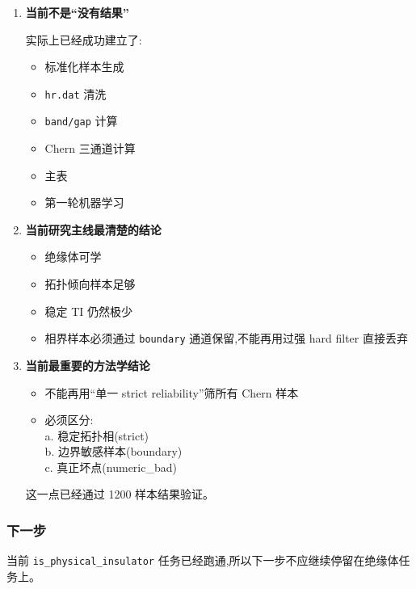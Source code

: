 \documentclass[lang=cn,scheme=chinese,color=blue,device=normal,toc=onecol,math=cm]{elegantbook}
\begin{document}
\begin{enumerate}
\item \textbf{当前不是“没有结果”}\par
 
实际上已经成功建立了:\par
 
\begin{itemize}
\item 标准化样本生成
\item \texttt{hr.dat} 清洗
\item \texttt{band/\allowbreak{}gap} 计算
\item Chern 三通道计算
\item 主表
\item 第一轮机器学习
\end{itemize}
\item \textbf{当前研究主线最清楚的结论}\par
 
\begin{itemize}
\item 绝缘体可学
\item 拓扑倾向样本足够
\item 稳定 TI 仍然极少
\item 相界样本必须通过 \texttt{boundary} 通道保留,不能再用过强 hard filter 直接丢弃
\end{itemize}
\item \textbf{当前最重要的方法学结论}\par
 
\begin{itemize}
\item 不能再用“单一 strict reliability”筛所有 Chern 样本
\item 必须区分:\\ a. 稳定拓扑相(strict)\\ b. 边界敏感样本(boundary)\\ c. 真正坏点(numeric\_\allowbreak{}bad)
\end{itemize}
 
这一点已经通过 1200 样本结果验证。\par
\end{enumerate}


\subsubsection{下一步}


当前 \texttt{is\_\allowbreak{}physical\_\allowbreak{}insulator} 任务已经跑通,所以下一步不应继续停留在绝缘体任务上。\par
\end{document}
